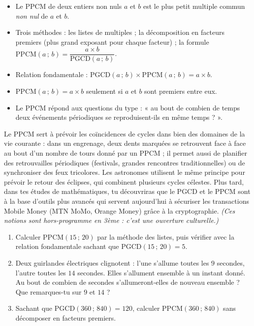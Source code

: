 \documentclass[11pt]{article}
\newcommand{\cle}[1]{{\popxbold\color{popdark}#1}}
\begin{document}
\begin{aretenir}
\begin{itemize}
\item Le \cle{PPCM} de deux entiers non nuls $a$ et $b$ est le plus petit multiple commun \emph{non nul} de $a$ et $b$.
\item Trois méthodes : les listes de multiples ; la décomposition en facteurs premiers (plus grand exposant pour chaque facteur) ; la formule $\mathrm{PPCM}(a\,;\,b) = \dfrac{a \times b}{\mathrm{PGCD}(a\,;\,b)}$.
\item Relation fondamentale : $\mathrm{PGCD}(a\,;\,b) \times \mathrm{PPCM}(a\,;\,b) = a \times b$.
\item $\mathrm{PPCM}(a\,;\,b) = a \times b$ seulement si $a$ et $b$ sont premiers entre eux.
\item Le PPCM répond aux questions du type : « au bout de combien de temps deux événements périodiques se reproduisent-ils en même temps ? ».
\end{itemize}
\end{aretenir}

\begin{savaistu}
Le PPCM sert à prévoir les coïncidences de cycles dans bien des domaines de la vie courante : dans un engrenage, deux dents marquées se retrouvent face à face au bout d'un nombre de tours donné par un PPCM ; il permet aussi de planifier des retrouvailles périodiques (festivals, grandes rencontres traditionnelles) ou de synchroniser des feux tricolores. Les astronomes utilisent le même principe pour prévoir le retour des éclipses, qui combinent plusieurs cycles célestes. Plus tard, dans tes études de mathématiques, tu découvriras que le PGCD et le PPCM sont à la base d'outils plus avancés qui servent aujourd'hui à sécuriser les transactions Mobile Money (MTN MoMo, Orange Money) grâce à la cryptographie. \emph{(Ces notions sont hors-programme en 3ème : c'est une ouverture culturelle.)}
\end{savaistu}

\begin{exercice}
\begin{enumerate}
\item Calculer $\mathrm{PPCM}(15\,;\,20)$ par la méthode des listes, puis vérifier avec la relation fondamentale sachant que $\mathrm{PGCD}(15\,;\,20) = 5$.
\item Deux guirlandes électriques clignotent : l'une s'allume toutes les $9$ secondes, l'autre toutes les $14$ secondes. Elles s'allument ensemble à un instant donné. Au bout de combien de secondes s'allumeront-elles de nouveau ensemble ? Que remarques-tu sur $9$ et $14$ ?
\item Sachant que $\mathrm{PGCD}(360\,;\,840) = 120$, calculer $\mathrm{PPCM}(360\,;\,840)$ sans décomposer en facteurs premiers.
\end{enumerate}
\end{exercice}
\end{document}
